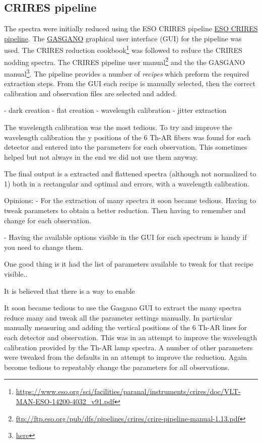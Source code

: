 \subsection{CRIRES pipeline}
The spectra were initially reduced using the ESO CRIRES pipeline \href{ESO CRIRES pipeline}{ESO CRIRES pipeline}. The \href{https://www.eso.org/sci/software/gasgano.html}{GASGANO} graphical user interface (GUI) for the pipeline was used. The CRIRES reduction cookbook\footnote{\href{https://www.eso.org/sci/facilities/paranal/instruments/crires/doc/VLT-MAN-ESO-14200-4032\_v91.pdf}{https://www.eso.org/sci/facilities/paranal/instruments/crires/doc/VLT-MAN-ESO-14200-4032\_v91.pdf}} was followed to reduce the CRIRES nodding spectra. The CRIRES pipeline user manual\footnote{\href{ftp://ftp.eso.org/pub/dfs/pipelines/crires/crire-pipeline-manual-1.13.pdf}{ftp://ftp.eso.org/pub/dfs/pipelines/crires/crire-pipeline-manual-1.13.pdf}} and the the GASGANO manual\footnote{\href{here}{here}}. The pipeline provides a number of \emph{recipes} which preform the required extraction steps. From the GUI each recipe is manually selected, then the correct calibration and observation files are selected and added. 

- dark creation
- flat creation
- wavelength calibration
- jitter extraction

The wavelength calibration was the most tedious. To try and improve the wavelength calibration the y positions of the 6 Th-AR fibers was found for each detector and entered into the parameters for each observation. This sometimes helped but not always in the end we did not use them anyway.

The final output is a extracted and flattened spectra (although not normalized to 1) both in a rectangular and optimal and errors, with a wavelength calibration.

Opinions:
- For the extraction of many spectra it soon became tedious. Having to tweak parameters to obtain a better reduction. Then having to remember and change for each observation.  

 - Having the available options visible in the GUI for each spectrum is handy if you need to change them.


One good thing is it had the list of parameters available to tweak for that recipe visible..

It is believed that there is a way to enable 

It soon became tedious to use the Gasgano GUI to extract the many spectra reduce many and tweak all the parameter settings manually. In particular manually measuring and adding the vertical positions of the 6 Th-AR lines for each detector and observation. This was in an attempt to improve the wavelength calibration provided by the Th-AR lamp spectra.
A number of other parameters were tweaked from the defaults in an attempt to  improve the reduction. Again become tedious to repeatably change the parameters for all observations.

